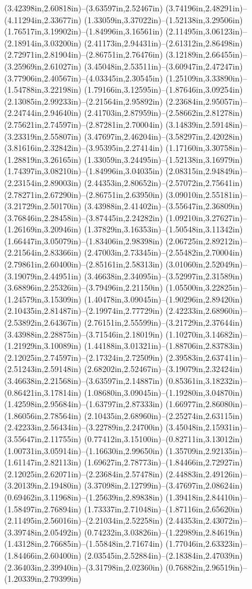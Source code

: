 (3.42398in,2.60818in)--(3.63597in,2.52467in) (3.74196in,2.48291in)--(4.11294in,2.33677in) (1.33059in,3.37022in)--(1.52138in,3.29506in) (1.76517in,3.19902in)--(1.84996in,3.16561in) (2.11495in,3.06123in)--(2.18914in,3.03200in) (2.41173in,2.94431in)--(2.61312in,2.86498in) (2.72971in,2.81904in)--(2.86751in,2.76476in) (3.12189in,2.66455in)--(3.25969in,2.61027in) (3.45048in,2.53511in)--(3.60947in,2.47247in) (3.77906in,2.40567in)--(4.03345in,2.30545in) (1.25109in,3.33890in)--(1.54788in,3.22198in) (1.79166in,3.12595in)--(1.87646in,3.09254in) (2.13085in,2.99233in)--(2.21564in,2.95892in) (2.23684in,2.95057in)--(2.24744in,2.94640in) (2.41703in,2.87959in)--(2.58662in,2.81278in) (2.75621in,2.74597in)--(2.87281in,2.70004in) (3.14839in,2.59148in)--(3.23319in,2.55807in) (3.47697in,2.46204in)--(3.58297in,2.42028in) (3.81616in,2.32842in)--(3.95395in,2.27414in) (1.17160in,3.30758in)--(1.28819in,3.26165in) (1.33059in,3.24495in)--(1.52138in,3.16979in) (1.74397in,3.08210in)--(1.84996in,3.04035in) (2.08315in,2.94849in)--(2.23154in,2.89003in) (2.44353in,2.80652in)--(2.57072in,2.75641in) (2.78271in,2.67290in)--(2.86751in,2.63950in) (3.09010in,2.55181in)--(3.21729in,2.50170in) (3.43988in,2.41402in)--(3.55647in,2.36809in) (3.76846in,2.28458in)--(3.87445in,2.24282in) (1.09210in,3.27627in)--(1.26169in,3.20946in) (1.37829in,3.16353in)--(1.50548in,3.11342in) (1.66447in,3.05079in)--(1.83406in,2.98398in) (2.06725in,2.89212in)--(2.21564in,2.83366in) (2.47003in,2.73345in)--(2.55482in,2.70004in) (2.79861in,2.60400in)--(2.85161in,2.58313in) (3.01060in,2.52049in)--(3.19079in,2.44951in) (3.46638in,2.34095in)--(3.52997in,2.31589in) (3.68896in,2.25326in)--(3.79496in,2.21150in) (1.05500in,3.22825in)--(1.24579in,3.15309in) (1.40478in,3.09045in)--(1.90296in,2.89420in) (2.10435in,2.81487in)--(2.19974in,2.77729in) (2.42233in,2.68960in)--(2.53892in,2.64367in) (2.76151in,2.55599in)--(3.21729in,2.37644in) (3.43988in,2.28875in)--(3.71546in,2.18019in) (1.10270in,3.14682in)--(1.21929in,3.10089in) (1.44188in,3.01321in)--(1.88706in,2.83783in) (2.12025in,2.74597in)--(2.17324in,2.72509in) (2.39583in,2.63741in)--(2.51243in,2.59148in) (2.68202in,2.52467in)--(3.19079in,2.32424in) (3.46638in,2.21568in)--(3.63597in,2.14887in) (0.85361in,3.18232in)--(0.86421in,3.17814in) (1.08680in,3.09045in)--(1.19280in,3.04870in) (1.42598in,2.95684in)--(1.63797in,2.87333in) (1.66977in,2.86080in)--(1.86056in,2.78564in) (2.10435in,2.68960in)--(2.25274in,2.63115in) (2.42233in,2.56434in)--(3.22789in,2.24700in) (3.45048in,2.15931in)--(3.55647in,2.11755in) (0.77412in,3.15100in)--(0.82711in,3.13012in) (1.00731in,3.05914in)--(1.16630in,2.99650in) (1.35709in,2.92135in)--(1.61147in,2.82113in) (1.69627in,2.78773in)--(1.84466in,2.72927in) (2.12025in,2.62071in)--(2.23684in,2.57478in) (2.44883in,2.49126in)--(3.20139in,2.19480in) (3.37098in,2.12799in)--(3.47697in,2.08624in) (0.69462in,3.11968in)--(1.25639in,2.89838in) (1.39418in,2.84410in)--(1.58497in,2.76894in) (1.73337in,2.71048in)--(1.87116in,2.65620in) (2.11495in,2.56016in)--(2.21034in,2.52258in) (2.44353in,2.43072in)--(3.39748in,2.05492in) (0.74232in,3.03826in)--(1.22989in,2.84619in) (1.43128in,2.76685in)--(1.55848in,2.71674in) (1.77046in,2.63323in)--(1.84466in,2.60400in) (2.03545in,2.52884in)--(2.18384in,2.47039in) (2.36403in,2.39940in)--(3.31798in,2.02360in) (0.76882in,2.96519in)--(1.20339in,2.79399in) 